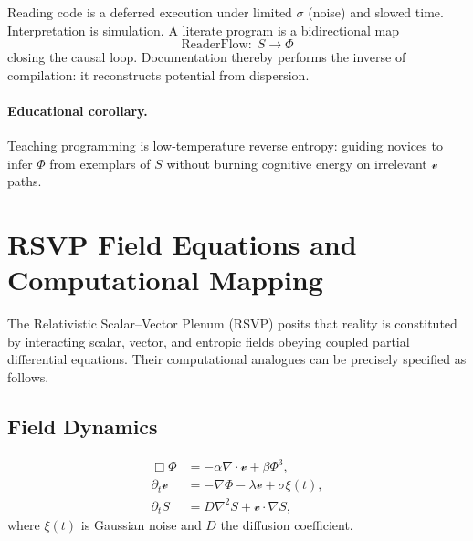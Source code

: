 \documentclass[12pt,a4paper]{article}
\theoremstyle{plain}
\theoremstyle{definition}
\theoremstyle{remark}
\newcommand{\Phifield}{\Phi}
\newcommand{\vfield}{\mathcal{v}}
\newcommand{\Sfield}{S}
\begin{document}
Reading code is a deferred execution under limited $\sigma$ (noise) and slowed time. Interpretation is simulation. A literate program is a bidirectional map
\[
\text{ReaderFlow}:\; \Sfield \longrightarrow \Phifield
\]
closing the causal loop. Documentation thereby performs the inverse of compilation: it reconstructs potential from dispersion.

\paragraph{Educational corollary.}
Teaching programming is low-temperature reverse entropy: guiding novices to infer $\Phifield$ from exemplars of $\Sfield$ without burning cognitive energy on irrelevant $\vfield$ paths.

\appendix
\renewcommand{\thesection}{\Alph{section}}

\section{RSVP Field Equations and Computational Mapping}
\label{app:rsvp}

The Relativistic Scalar–Vector Plenum (RSVP) posits that reality is constituted by interacting scalar, vector, and entropic fields obeying coupled partial differential equations. Their computational analogues can be precisely specified as follows.

\subsection{Field Dynamics}
\begin{align}
\Box \Phifield &= -\alpha \nabla \cdot \vfield + \beta \Phifield^3, \label{eq:rsvp-scalar} \\
\partial_t \vfield &= -\nabla \Phifield - \lambda \vfield + \sigma \xi(t), \label{eq:rsvp-vector} \\
\partial_t \Sfield &= D \nabla^2 \Sfield + \vfield\!\cdot\!\nabla \Sfield, \label{eq:rsvp-entropy}
\end{align}
where $\xi(t)$ is Gaussian noise and $D$ the diffusion coefficient.
\end{document}
